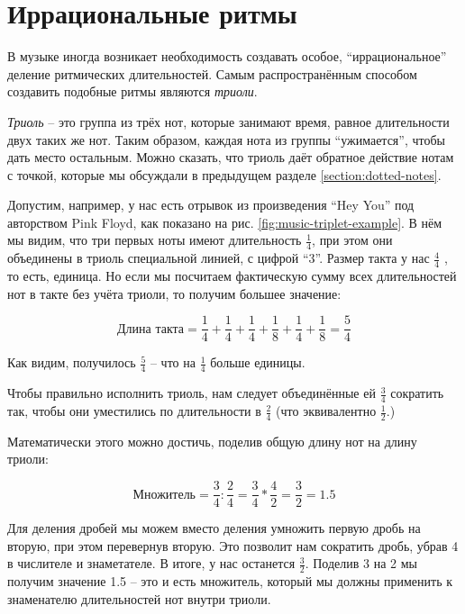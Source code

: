 \documentclass[../sparc.tex]{subfiles}
\begin{document}
\section{Иррациональные ритмы}

В музыке иногда возникает необходимость создавать особое, ``иррациональное''
деление ритмических длительностей.  Самым распространённым способом создавить
подобные ритмы являются \emph{триоли}.

\emph{Триоль} -- это группа из трёх нот, которые занимают время, равное
длительности двух таких же нот.  Таким образом, каждая нота из группы
``ужимается'', чтобы дать место остальным.  Можно сказать, что триоль даёт
обратное действие нотам с точкой, которые мы обсуждали в предыдущем разделе
\ref{section:dotted-notes}.


Допустим, например, у нас есть отрывок из произведения ``Hey You'' под
авторством Pink Floyd, как показано на рис. \ref{fig:music-triplet-example}.  В
нём мы видим, что три первых ноты имеют длительность $\frac{1}{4}$, при этом они
объединены в триоль специальной линией, с цифрой ``3''.  Размер такта у нас
$\frac{4}{4}$ , то есть, единица.  Но если мы посчитаем фактическую сумму всех
длительностей нот в такте без учёта триоли, то получим большее значение:

\begin{equation}
  \mbox{Длина такта} = \frac{1}{4} + \frac{1}{4}
  + \frac{1}{4} + \frac{1}{8} + \frac{1}{4} + \frac{1}{8} = \frac{5}{4}
\end{equation}

Как видим, получилось $\frac{5}{4}$ -- что на $\frac{1}{4}$ больше единицы.

Чтобы правильно исполнить триоль, нам следует объединённые ей $\frac{3}{4}$
сократить так, чтобы они уместились по длительности в $\frac{2}{4}$ (что
эквивалентно $\frac{1}{2}$.)

Математически этого можно достичь, поделив общую длину нот на длину триоли:

\begin{equation}
  \mbox{Множитель} = \frac{3}{4} : \frac{2}{4} = \frac{3}{4} * \frac{4}{2}
  = \frac{3}{2} = 1.5
\end{equation}

Для деления дробей мы можем вместо деления умножить первую дробь на вторую, при
этом перевернув вторую.  Это позволит нам сократить дробь, убрав 4 в числителе и
знаметателе.  В итоге, у нас останется $\frac{3}{2}$.  Поделив 3 на 2 мы получим
значение 1.5 -- это и есть множитель, который мы должны применить к знаменателю
длительностей нот внутри триоли.
\end{document}
